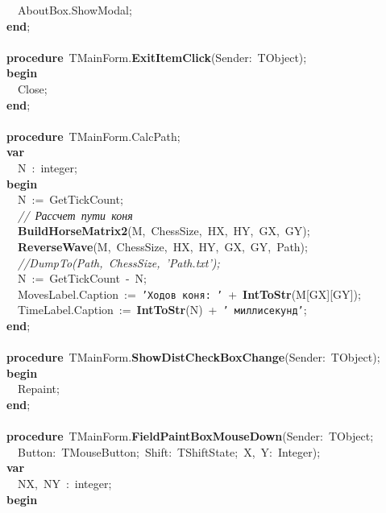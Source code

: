\mbox{}\ \ AboutBox.ShowModal; \\
\mbox{}\textbf{end}; \\
\mbox{} \\
\mbox{}\textbf{procedure}\ TMainForm.\textbf{ExitItemClick}(Sender:\ TObject); \\
\mbox{}\textbf{begin} \\
\mbox{}\ \ Close; \\
\mbox{}\textbf{end}; \\
\mbox{} \\
\mbox{}\textbf{procedure}\ TMainForm.CalcPath; \\
\mbox{}\textbf{var} \\
\mbox{}\ \ N\ :\ integer; \\
\mbox{}\textbf{begin} \\
\mbox{}\ \ N\ :=\ GetTickCount; \\
\mbox{}\ \ \textit{//\ Рассчет\ пути\ коня} \\
\mbox{}\ \ \textbf{BuildHorseMatrix2}(M,\ ChessSize,\ HX,\ HY,\ GX,\ GY); \\
\mbox{}\ \ \textbf{ReverseWave}(M,\ ChessSize,\ HX,\ HY,\ GX,\ GY,\ Path); \\
\mbox{}\ \ \textit{//DumpTo(Path,\ ChessSize,\ 'Path.txt');} \\
\mbox{}\ \ N\ :=\ GetTickCount\ -\ N; \\
\mbox{}\ \ MovesLabel.Caption\ :=\ \texttt{'Ходов\ коня:\ '}\ +\ \textbf{IntToStr}(M[GX][GY]); \\
\mbox{}\ \ TimeLabel.Caption\ :=\ \textbf{IntToStr}(N)\ +\ \texttt{'\ миллисекунд'}; \\
\mbox{}\textbf{end}; \\
\mbox{} \\
\mbox{}\textbf{procedure}\ TMainForm.\textbf{ShowDistCheckBoxChange}(Sender:\ TObject); \\
\mbox{}\textbf{begin} \\
\mbox{}\ \ Repaint; \\
\mbox{}\textbf{end}; \\
\mbox{} \\
\mbox{}\textbf{procedure}\ TMainForm.\textbf{FieldPaintBoxMouseDown}(Sender:\ TObject; \\
\mbox{}\ \ Button:\ TMouseButton;\ Shift:\ TShiftState;\ X,\ Y:\ Integer); \\
\mbox{}\textbf{var} \\
\mbox{}\ \ NX,\ NY\ :\ integer; \\
\mbox{}\textbf{begin} \\
